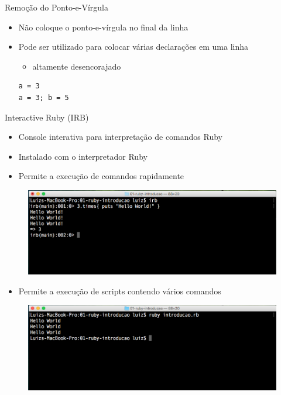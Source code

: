 \begin{frame}[fragile,t]{Remoção do Ponto-e-Vírgula}
  \begin{itemize}
    \item \alert{Não} coloque o \alert{ponto-e-vírgula} no final da linha
    \item Pode ser utilizado para colocar várias declarações em uma linha
    \begin{itemize}
      \item altamente \alert{desencorajado}
    \end{itemize}
    \begin{lstlisting}[style=RubyInputStyle]
a = 3	
a = 3; b = 5 
    \end{lstlisting}
  \end{itemize}
\end{frame}
\begin{frame}{Interactive Ruby (IRB)}
  \begin{itemize}
    \item Console \alert{interativa} para interpretação de comandos Ruby
    \item Instalado com o interpretador Ruby
    \item Permite a \alert{execução} de comandos rapidamente
  \end{itemize}
  \begin{figure}[hbt]
    \includegraphics[scale=.35]{imagens/ruby-irb.png}
  \end{figure}
\framebreak
  \begin{itemize}
  	\item Permite a \alert{execução} de \alert{scripts} contendo vários comandos
  \end{itemize}
  \begin{figure}[hbt]
    \includegraphics[scale=.35]{imagens/ruby-interpretador.png}
  \end{figure}
\end{frame}
